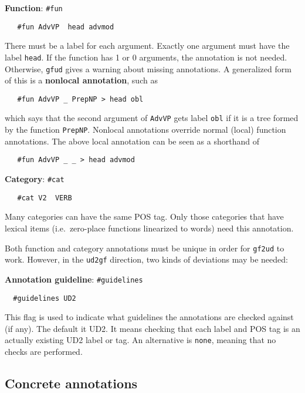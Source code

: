 \textbf{Function}: \texttt{\#fun}

\begin{verbatim}
   #fun AdvVP  head advmod
\end{verbatim}

There must be a label for each argument. Exactly one argument must have
the label \texttt{head}. If the function has 1 or 0 arguments, the
annotation is not needed. Otherwise, \texttt{gfud} gives a warning about
missing annotations. A generalized form of this is a \textbf{nonlocal
annotation}, such as

\begin{verbatim}
   #fun AdvVP _ PrepNP > head obl
\end{verbatim}

which says that the second argument of \texttt{AdvVP} gets label
\texttt{obl} if it is a tree formed by the function \texttt{PrepNP}.
Nonlocal annotations override normal (local) function annotations. The
above local annotation can be seen as a shorthand of

\begin{verbatim}
   #fun AdvVP _ _ > head advmod
\end{verbatim}

\textbf{Category}: \texttt{\#cat}

\begin{verbatim}
   #cat V2  VERB
\end{verbatim}

Many categories can have the same POS tag. Only those categories that
have lexical items (i.e.~zero-place functions linearized to words) need
this annotation.

Both function and category annotations must be unique in order for
\texttt{gf2ud} to work. However, in the \texttt{ud2gf} direction, two
kinds of deviations may be needed:

\textbf{Annotation guideline}: \texttt{\#guidelines}

\begin{verbatim}
  #guidelines UD2
\end{verbatim}

This flag is used to indicate what guidelines the annotations are
checked against (if any). The default it UD2. It means checking that
each label and POS tag is an actually existing UD2 label or tag. An
alternative is \texttt{none}, meaning that no checks are performed.

\hypertarget{concrete-annotations}{%
\subsection{Concrete annotations}\label{concrete-annotations}}

